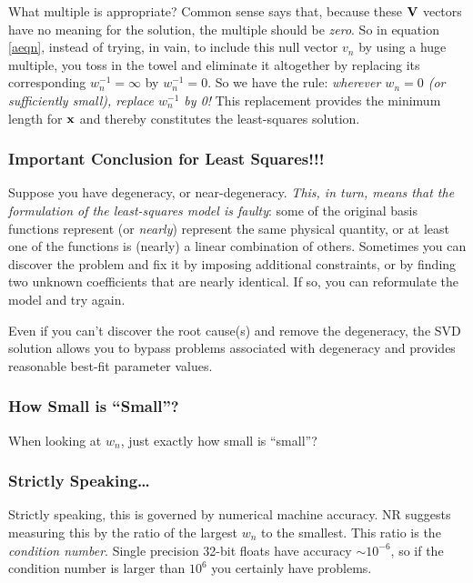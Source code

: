 \documentclass[psfig,preprint]{aastex}
\begin{document}
What multiple is appropriate? Common sense says that, because these $\bf
V$ vectors have no meaning for the solution, the multiple should be {\it
zero}.  So in equation \ref{aeqn}, instead of trying, in vain, to
include this null vector $v_n$ by using a huge multiple, you toss in the
towel and eliminate it altogether by replacing its corresponding
$w_n^{-1} = \infty$ by $w_n^{-1} = 0$. So we have the rule: {\it
wherever $w_n = 0$ (or sufficiently small), replace $w_n^{-1}$ by 0!}
This replacement provides the minimum length for $\bf x$ and thereby
constitutes the least-squares solution.

\subsubsection{Important Conclusion for Least Squares!!!} \label{svdimport}

	Suppose you have degeneracy, or near-degeneracy. {\it This, in
turn, means that the formulation of the least-squares model is faulty}:
some of the original basis functions represent (or {\it nearly})
represent the same physical quantity, or at least one of the functions
is (nearly) a linear combination of others.  Sometimes you can discover
the problem and fix it by imposing additional constraints, or by finding
two unknown coefficients that are nearly identical.  If so, you can
reformulate the model and try again.

Even if you can't discover the root cause(s) and remove the degeneracy,
the SVD solution allows you to bypass problems associated with
degeneracy and provides reasonable best-fit parameter values.

\subsubsection{How Small is ``Small''?}

	When looking at $w_n$, just exactly how small is ``small''? 

\subsubsection{Strictly Speaking\dots}

	Strictly speaking, this is governed by numerical machine
accuracy. NR suggests measuring this by the ratio of the largest $w_n$
to the smallest. This ratio is the {\it condition number}. Single
precision 32-bit floats have accuracy $\sim 10^{-6}$, so if the
condition number is larger than $10^6$ you certainly have problems.
\end{document}
